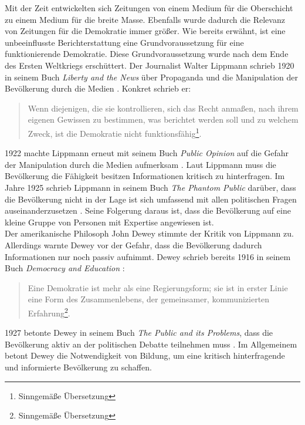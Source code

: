 Mit der Zeit entwickelten sich Zeitungen von einem Medium für die Oberschicht zu einem Medium für die breite Masse.
Ebenfalls wurde dadurch die Relevanz von Zeitungen für die Demokratie immer größer.
Wie bereits erwähnt, ist eine unbeeinflusste Berichterstattung eine Grundvoraussetzung für eine funktionierende Demokratie.
Diese Grundvoraussetzung wurde nach dem Ende des Ersten Weltkriegs erschüttert.
Der Journalist Walter Lippmann schrieb 1920 in seinem Buch \textit{Liberty and the News} über Propaganda und die Manipulation der Bevölkerung durch die Medien \cite{liberty-and-news}.
Konkret schrieb er:
\begin{quote}
    \glqq Wenn diejenigen, die sie kontrollieren, sich das Recht anmaßen, nach ihrem eigenen Gewissen zu bestimmen, was berichtet werden soll und zu welchem Zweck, ist die Demokratie nicht funktionsfähig\grqq{}\footnote{Sinngemäße Übersetzung}.
\end{quote}
1922 machte Lippmann erneut mit seinem Buch \textit{Public Opinion} auf die Gefahr der Manipulation durch die Medien aufmerksam \cite{public-opinion}.
Laut Lippmann muss die Bevölkerung die Fähigkeit besitzen Informationen kritisch zu hinterfragen.
Im Jahre 1925 schrieb Lippmann in seinem Buch \textit{The Phantom Public} darüber, dass die Bevölkerung nicht in der Lage ist sich umfassend mit allen politischen Fragen auseinanderzusetzen \cite{phantom-public}.
Seine Folgerung daraus ist, dass die Bevölkerung auf eine kleine Gruppe von Personen mit Expertise angewiesen ist. \\

Der amerikanische Philosoph John Dewey stimmte der Kritik von Lippmann zu.
Allerdings warnte Dewey vor der Gefahr, dass die Bevölkerung dadurch Informationen nur noch passiv aufnimmt.
Dewey schrieb bereits 1916 in seinem Buch \textit{Democracy and Education} \cite{democracy-and-education}:
\begin{quote}
    \glqq Eine Demokratie ist mehr als eine Regierungsform; sie ist in erster Linie eine Form des Zusammenlebens, der gemeinsamer, kommunizierten Erfahrung\grqq{}\footnote{Sinngemäße Übersetzung}.
\end{quote}
1927 betonte Dewey in seinem Buch \textit{The Public and its Problems}, dass die Bevölkerung aktiv an der politischen Debatte teilnehmen muss \cite{public-problems}.
Im Allgemeinem betont Dewey die Notwendigkeit von Bildung, um eine kritisch hinterfragende und informierte Bevölkerung zu schaffen.\\

